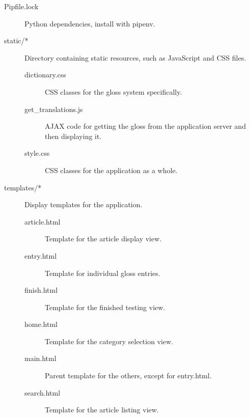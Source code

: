 \begin{description}
\begin{description}
	\item[Pipfile.lock] Python dependencies, install with pipenv.
	
	\item[static/*] Directory containing static resources, such as JavaScript and CSS files. 
		\begin{description}
			\item[dictionary.css] CSS classes for the gloss system specifically.
			
			\item[get\_translations.js] AJAX code for getting the gloss from the application server and then displaying it.
			
			\item[style.css] CSS classes for the application as a whole.
		\end{description}
	
	\item[templates/*] Display templates for the application.
		\begin{description}
			\item[article.html] Template for the article display view.
			
			\item[entry.html] Template for individual gloss entries.
			
			\item[finish.html] Template for the finished testing view.
			
			\item[home.html] Template for the category selection view.
			
			\item[main.html] Parent template for the others, except for entry.html.
			
			\item[search.html] Template for the article listing view. 
		\end{description}
	\end{description}

\end{description}